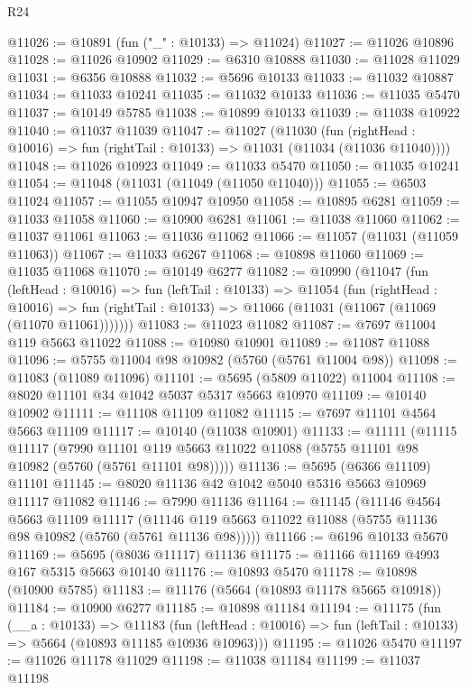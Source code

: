 \begin{lexlean}{R24}
\begin{coremodule}
@11026 := @10891 (fun ("_" : @10133) => @11024)
@11027 := @11026 @10896
@11028 := @11026 @10902
@11029 := @6310 @10888
@11030 := @11028 @11029
@11031 := @6356 @10888
@11032 := @5696 @10133
@11033 := @11032 @10887
@11034 := @11033 @10241
@11035 := @11032 @10133
@11036 := @11035 @5470
@11037 := @10149 @5785
@11038 := @10899 @10133
@11039 := @11038 @10922
@11040 := @11037 @11039
@11047 := @11027
    (@11030
      (fun (rightHead : @10016) => fun (rightTail : @10133) => @11031 (@11034 (@11036 @11040))))
@11048 := @11026 @10923
@11049 := @11033 @5470
@11050 := @11035 @10241
@11054 := @11048 (@11031 (@11049 (@11050 @11040)))
@11055 := @6503 @11024
@11057 := @11055 @10947 @10950
@11058 := @10895 @6281
@11059 := @11033 @11058
@11060 := @10900 @6281
@11061 := @11038 @11060
@11062 := @11037 @11061
@11063 := @11036 @11062
@11066 := @11057 (@11031 (@11059 @11063))
@11067 := @11033 @6267
@11068 := @10898 @11060
@11069 := @11035 @11068
@11070 := @10149 @6277
@11082 := @10990
    (@11047
      (fun (leftHead : @10016) =>
      fun (leftTail : @10133) =>
      @11054
        (fun (rightHead : @10016) =>
        fun (rightTail : @10133) => @11066 (@11031 (@11067 (@11069 (@11070 @11061)))))))
@11083 := @11023 @11082
@11087 := @7697 @11004 @119 @5663 @11022
@11088 := @10980 @10901
@11089 := @11087 @11088
@11096 := @5755 @11004 @98 @10982 (@5760 (@5761 @11004 @98))
@11098 := @11083 (@11089 @11096)
@11101 := @5695 (@5809 @11022) @11004
@11108 := @8020 @11101 @34 @1042 @5037 @5317 @5663 @10970
@11109 := @10140 @10902
@11111 := @11108 @11109 @11082
@11115 := @7697 @11101 @4564 @5663 @11109
@11117 := @10140 (@11038 @10901)
@11133 := @11111
    (@11115
      @11117
      (@7990 @11101 @119 @5663 @11022 @11088 (@5755 @11101 @98 @10982 (@5760 (@5761 @11101 @98)))))
@11136 := @5695 (@6366 @11109) @11101
@11145 := @8020 @11136 @42 @1042 @5040 @5316 @5663 @10969 @11117 @11082
@11146 := @7990 @11136
@11164 := @11145
    (@11146
      @4564
      @5663
      @11109
      @11117
      (@11146 @119 @5663 @11022 @11088 (@5755 @11136 @98 @10982 (@5760 (@5761 @11136 @98)))))
@11166 := @6196 @10133 @5670
@11169 := @5695 (@8036 @11117) @11136
@11175 := @11166 @11169 @4993 @167 @5315 @5663 @10140
@11176 := @10893 @5470
@11178 := @10898 (@10900 @5785)
@11183 := @11176 (@5664 (@10893 @11178 @5665 @10918))
@11184 := @10900 @6277
@11185 := @10898 @11184
@11194 := @11175
    (fun (__a : @10133) =>
    @11183
      (fun (leftHead : @10016) => fun (leftTail : @10133) => @5664 (@10893 @11185 @10936 @10963)))
@11195 := @11026 @5470
@11197 := @11026 @11178 @11029
@11198 := @11038 @11184
@11199 := @11037 @11198

\end{coremodule}
\end{lexlean}
